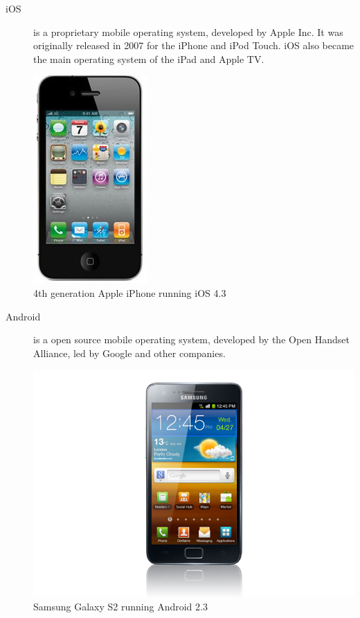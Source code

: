 

\begin{description}
\item[iOS]is a proprietary mobile operating system, developed by Apple Inc. It was originally released in 2007 for the iPhone and iPod Touch. iOS also became the main operating system of the iPad and Apple TV.

\cite{Sylvain2012}

\begin{centering}
\includegraphics[scale=0.5]{images/iphone4.jpg}\\{4th generation Apple iPhone running iOS 4.3}\\
\end{centering}

\item[Android] is a open source mobile operating system, developed by the Open Handset Alliance, led by Google and other companies.\cite{Inc.2012}

\begin{centering}
\includegraphics[scale=0.35]{images/android_sgs2.jpg}\\{Samsung Galaxy S2 running Android 2.3}\\
\end{centering}


\end{description}
